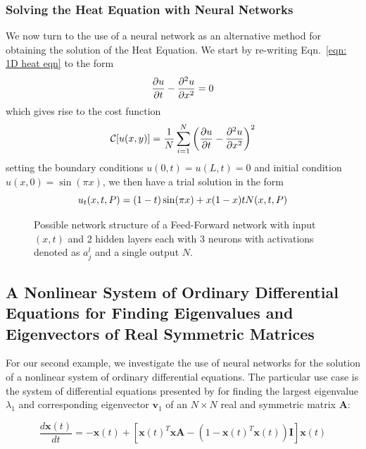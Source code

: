 \documentclass[reprint, english, nofootinbib]{revtex4-2}
\begin{document}
\subsubsection{Solving the Heat Equation with Neural Networks}
\noindent
We now turn to the use of a neural network as an alternative method for obtaining the solution of the Heat Equation. We start by re-writing Eqn.~\ref{eqn: 1D heat eqn} to the form
\begin{equation}
    \pdv{u}{t} - \pdv[2]{u}{x} = 0
\end{equation}
which gives rise to the cost function 
\begin{equation}
    \mathcal C\qty[u\qty(x, y)] = \frac{1}{N}\sum_{i=1}^N \qty(\pdv{u}{t} - \pdv[2]{u}{x})^2
\end{equation}
setting the boundary conditions $u(0, t) = u(L, t) = 0$ and initial condition $u(x, 0) = \sin(\pi x)$, we then have a trial solution in the form
\begin{equation}
    u_t(x, t, P) = \qty(1 - t)\sin(\pi x) + x(1 - x)t N(x, t, P)
\end{equation}

\begin{figure}[h!tb]
   \center
    
   \caption{Possible network structure of a Feed-Forward network with input $(x,t)$ and 2 hidden layers each with 3 neurons with activations denoted as $a^l_j$ and a single output $N$.}
\end{figure}


\subsection{A Nonlinear System of Ordinary Differential Equations for Finding Eigenvalues and Eigenvectors of Real Symmetric Matrices}

For our second example, we investigate the use of neural networks for the solution of a nonlinear system of ordinary differential equations. The particular use case is the system of differential equations presented by \cite{Yi_2004} for finding the largest eigenvalue $\lambda_{1}$ and corresponding eigenvector $\mathbf{v}_1$ of an $N \times N$ real and symmetric matrix $\mathbf{A}$:

\begin{equation}
\label{eq:yi_eq}
\frac{d \mathbf{x}(t)}{dt} = - \mathbf{x}(t) + [\mathbf{x}(t)^T \mathbf{x} \mathbf{A} - (1 - \mathbf{x}(t)^T \mathbf{x}(t)) \mathbf{I} ] \mathbf{x}(t)
\end{equation}
\end{document}
